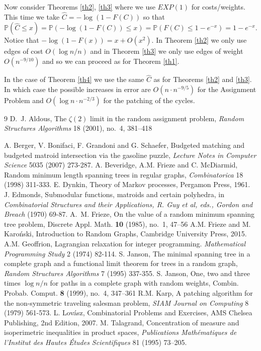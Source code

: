 \documentclass[12pt]{article}
\newcommand{\1}{\textbf{1}}
\newcommand{\wh}[1]{\widehat{#1}}
\def\Pr{\mathbb{P}}
\begin{document}
Now consider Theorems \ref{th2}, \ref{th3} where we use $EXP(1)$ for costs/weights. This time we take $\wh C=-\log(1-F(C))$ so that $\Pr(\wh C\leq x)=\Pr(-\log(1-F(C))\leq x)=\Pr(F(C)\leq1 -e^{-x})=1-e^{-x}$. Notice that $-\log(1-F(x))=x+O(x^2)$. In Theorem \ref{th2} we only use edges of cost $O(\log n/n)$ and in Theorem \ref{th3} we only use edges of weight $O(n^{-9/10})$ and so we can proceed as for Theorem \ref{th1}.

In the case of Theorem \ref{th4} we use the same $\wh C$ as for Theorems \ref{th2} and \ref{th3}. In which case the possible increases in error are $O(n\cdot n^{-9/5})$ for the Assignment Problem and $O(\log n\cdot n^{-2/3})$ for the patching of the cycles. 

\begin{thebibliography}{9}
 D.~J. Aldous, The $\zeta(2)$ limit in the random assignment problem, {\em Random Structures Algorithms} 18 (2001), no.~4, 381--418
%

 A. Berger, V. Bonifaci, F. Grandoni and G. Schaefer, Budgeted matching and budgeted matroid intersection via the gasoline puzzle, {\em Lecture Notes in Computer Science} 5035 (2007) 273-287.
%
 A. Beveridge, A.M. Frieze and C. McDiarmid, Random minimum length spanning trees in regular graphs, {\em Combinatorica} 18 (1998) 311-333.
%
%
 E. Dynkin, Theory of Markov processes, Pergamon Press, 1961. 
%
  J. Edmonds, Submodular functions, matroids and certain polyhedra, in {\em Combinatorial Structures and their Applications, R. Guy et al, eds., Gordon and Breach} (1970) 69-87.
%
 A.~M. Frieze, On the value of a random minimum spanning tree problem, Discrete Appl. Math. {\bf 10} (1985), no.~1, 47--56
%
  A.M. Frieze and M. Karo\'nski, Introduction to Random Graphs, Cambridge University Press, 2015.
%
 A.M. Geoffrion, Lagrangian relaxation for integer programming. {\em Mathematical Programming Study} 2 (1974) 82-114.
%
  S. Janson, The minimal spanning tree in a complete graph and a functional limit theorem for trees in a random graph,  {\em Random Structures Algorithms} 7 (1995) 337-355.
  S. Janson, One, two and three times $\log n/n$ for paths in a complete graph with random weights, Combin. Probab. Comput. {\bf 8} (1999), no.~4, 347--361
 R.M. Karp, A patching algorithm for the non-symmetric traveling 
salesman problem, {\em SIAM Journal on Computing} 8 (1979) 561-573.
%
 L. Lov\'asz, Combinatorial Problems and Exercises, AMS Chelsea Publishing, 2nd Edition, 2007.
%
 M. Talagrand, Concentration of measure and isoperimetric inequalities in product spaces, {\em Publications Math\'ematiques de l'Institut des Hautes \'Etudes Scientifiques} 81 (1995) 73–205.
\end{thebibliography}
\end{document}
